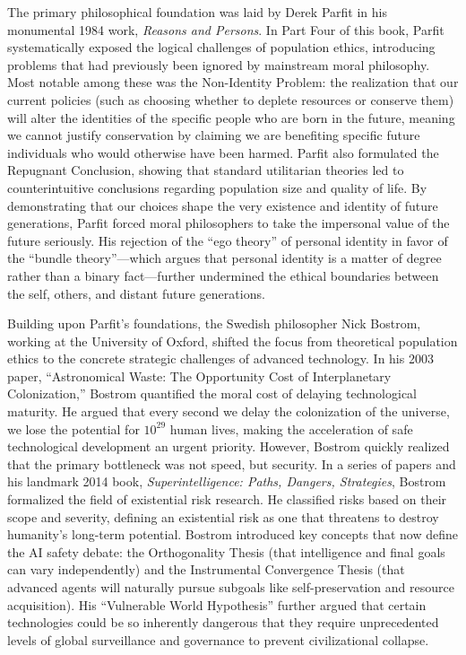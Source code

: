 The primary philosophical foundation was laid by Derek Parfit in his
monumental 1984 work, \emph{Reasons and Persons}. In Part Four of this
book, Parfit systematically exposed the logical challenges of population
ethics, introducing problems that had previously been ignored by
mainstream moral philosophy. Most notable among these was the
Non-Identity Problem: the realization that our current policies (such as
choosing whether to deplete resources or conserve them) will alter the
identities of the specific people who are born in the future, meaning we
cannot justify conservation by claiming we are benefiting specific
future individuals who would otherwise have been harmed. Parfit also
formulated the Repugnant Conclusion, showing that standard utilitarian
theories led to counterintuitive conclusions regarding population size
and quality of life. By demonstrating that our choices shape the very
existence and identity of future generations, Parfit forced moral
philosophers to take the impersonal value of the future seriously. His
rejection of the ``ego theory'' of personal identity in favor of the
``bundle theory''---which argues that personal identity is a matter of
degree rather than a binary fact---further undermined the ethical
boundaries between the self, others, and distant future generations.

Building upon Parfit's foundations, the Swedish philosopher Nick
Bostrom, working at the University of Oxford, shifted the focus from
theoretical population ethics to the concrete strategic challenges of
advanced technology. In his 2003 paper, ``Astronomical Waste: The
Opportunity Cost of Interplanetary Colonization,'' Bostrom quantified
the moral cost of delaying technological maturity. He argued that every
second we delay the colonization of the universe, we lose the potential
for \(10^{29}\) human lives, making the acceleration of safe
technological development an urgent priority. However, Bostrom quickly
realized that the primary bottleneck was not speed, but security. In a
series of papers and his landmark 2014 book, \emph{Superintelligence:
Paths, Dangers, Strategies}, Bostrom formalized the field of existential
risk research. He classified risks based on their scope and severity,
defining an existential risk as one that threatens to destroy humanity's
long-term potential. Bostrom introduced key concepts that now define the
AI safety debate: the Orthogonality Thesis (that intelligence and final
goals can vary independently) and the Instrumental Convergence Thesis
(that advanced agents will naturally pursue subgoals like
self-preservation and resource acquisition). His ``Vulnerable World
Hypothesis'' further argued that certain technologies could be so
inherently dangerous that they require unprecedented levels of global
surveillance and governance to prevent civilizational collapse.

